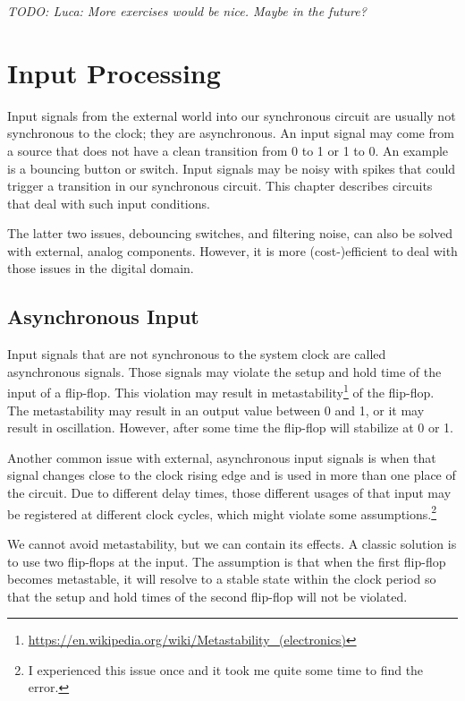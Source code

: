 \documentclass[%
    10pt,
    headinclude, footexclude,
    openright, %
    notitlepage,
    cleardoubleempty,
    headsepline,
    pointlessnumbers,
    bibtotoc, idxtotoc,
    ]{scrbook}
\newcommand{\todo}[1]{{\emph{TODO: #1}}}
\newcommand{\myref}[2]{\href{#1}{#2}}
\renewcommand{\myref}[2]{{#2}{\footnote{\url{#1}}}}
\begin{document}
\todo{Luca: More exercises would be nice. Maybe in the future?}


\chapter{Input Processing}
\label{sec:input}

Input signals from the external world into our synchronous circuit are usually
not synchronous to the clock; they are asynchronous.
An input signal may come from a source that does not have a clean transition from
0 to 1 or 1 to 0. An example is a bouncing button or switch.
Input signals may be noisy with spikes that could trigger a transition in our
synchronous circuit. This chapter describes circuits that deal with such input
conditions.

The latter two issues, debouncing switches, and filtering noise, can also be
solved with external, analog components. However, it is more (cost-)efficient
to deal with those issues in the digital domain.

\section{Asynchronous Input}

Input signals that are not synchronous to the system clock are called
asynchronous signals. Those signals may violate the setup and hold time
of the input of a flip-flop. This violation may result in
\myref{https://en.wikipedia.org/wiki/Metastability_(electronics)}{metastability}
of the flip-flop. The metastability may result in an output value between 0 and
1, or it may result in oscillation. However, after some time the flip-flop will
stabilize at 0 or 1.

Another common issue with external, asynchronous input signals is when
that signal changes close to the clock rising edge and is used in more than one
place of the circuit. Due to different delay times, those different usages of that
input may be registered at different clock cycles, which might violate
some assumptions.\footnote{I experienced this issue once and it took me
quite some time to find the error.}

We cannot avoid metastability, but we can contain its effects.
A classic solution is to use two flip-flops at the input. The assumption is that
when the first flip-flop becomes metastable, it will resolve to a stable
state within the clock period so that the setup and hold times of the
second flip-flop will not be violated.
\end{document}
